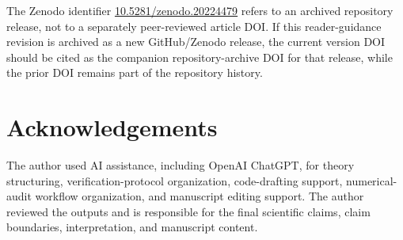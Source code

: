 \documentclass[11pt,a4paper]{article}
\begin{document}
The Zenodo identifier \href{https://doi.org/10.5281/zenodo.20224479}{10.5281/zenodo.20224479} refers to an archived repository release, not to a separately peer-reviewed article DOI. If this reader-guidance revision is archived as a new GitHub/Zenodo release, the current version DOI should be cited as the companion repository-archive DOI for that release, while the prior DOI remains part of the repository history.

\section*{Acknowledgements}
The author used AI assistance, including OpenAI ChatGPT, for theory structuring, verification-protocol organization, code-drafting support, numerical-audit workflow organization, and manuscript editing support. The author reviewed the outputs and is responsible for the final scientific claims, claim boundaries, interpretation, and manuscript content.
\end{document}
